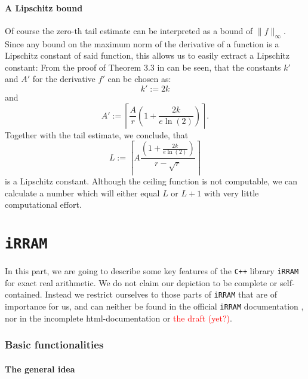 \documentclass{article}
\newcommand{\irram}{\texttt{iRRAM}\xspace}
\newcommand{\cc}{\texttt{C++}\xspace}
\newcommand{\temp}[1]{\textcolor{red}{#1}}
\begin{document}
\subsection{A Lipschitz bound}

Of course the zero-th tail estimate can be interpreted as a bound of $\|f\|_\infty$. Since any bound on the maximum norm of the derivative of a function is a Lipschitz constant of said function, this allows us to easily extract a Lipschitz constant: From the proof of Theorem 3.3 in \cite{gevrey} can be seen, that the constants $k'$ and $A'$ for the derivative $f'$ can be chosen as:
\[ k' := 2 k \]
and
\[ A' := \left\lceil \frac{A}{r} \left(1+ \frac{2k}{e \ln(2)}\right)\right\rceil. \]
Together with the tail estimate, we conclude, that
\[ L := \left\lceil A \frac{\left(1 + \frac{2k}{e\ln(2)}\right)}{r-\sqrt{r}}\right\rceil \]
is a Lipschitz constant. Although the ceiling function is not computable, we can calculate a number which will either equal $L$ or $L+1$ with very little computational effort.

\part{\irram}

In this part, we are going to describe some key features of the \cc library \irram for exact real arithmetic. We do not claim our depiction to be complete or self-contained. Instead we restrict ourselves to those parts of \irram that are of importance for us, and can neither be found in the official \irram documentation \cite{Muller2009}, nor in the incomplete html-documentation \cite{Muller2001-2003} or \temp{the draft} \cite{Muller2013} \temp{(yet?)}.

\section{Basic functionalities}

\subsection{The general idea}
\end{document}
